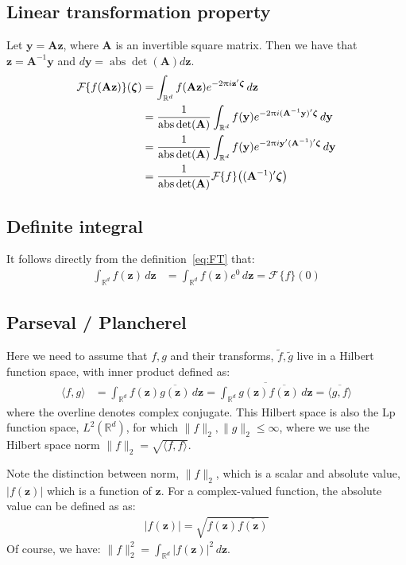 \documentclass[a4paper,oneside,12pt,english]{report}
\def\zvec{\mathbf{z}}
\DeclareMathOperator{\abs}{abs}
\def\R{\mathbb{R}}
\def\yvec{\mathbf{y}}
\def\Fset{\mathcal{F}}
\newcommand\FT[2][]{\Fset_{#1}\{#2\}}
\def\conj#1{\overline{#1}}
\begin{document}
\subsection{Linear transformation property}
\def\Amat{\mathbf{A}}
Let $\yvec = \Amat\zvec$, where $\Amat$ is an invertible square matrix. Then we have that $\zvec = \Amat^{-1}\yvec$ and $d\yvec = \abs{\det(\Amat)}d\zvec$. 
\begin{align}
\label{eq:ftscaling}
\begin{split}
\FT{f(\Amat\zvec)}(\zetavec) &= \int_{\R^d} f(\Amat\zvec)e^{-2\uppi i\zvec'\zetavec}\,d\zvec\\
&= \frac1{\abs{\det(\Amat)}}\int_{\R^d} f(\yvec)e^{-2\uppi i(\Amat^{-1}\yvec)'\zetavec}\,d\yvec\\
&= \frac1{\abs{\det(\Amat)}}\int_{\R^d} f(\yvec)e^{-2\uppi i\yvec'(\Amat^{-1})'\zetavec}\,d\yvec\\
&= \frac1{\abs{\det(\Amat)}}\FT{f}\bigl((\Amat^{-1})'\zetavec\bigr)
\end{split}
\end{align}

 
\subsection{Definite integral}
It follows directly from the definition~\eqref{eq:FT} that:
\begin{align}
\label{eq:di}
\int_{\R^d} f(\zvec)\,d\zvec &= \int_{\R^d} f(\zvec)e^0\,d\zvec = \FT{f}(0)
\end{align}



\subsection{Parseval / Plancherel}
\def\dotp#1#2{\langle#1,#2\rangle}
\def\norm#1{\lVert#1\rVert_2}
\def\abs#1{\lvert#1\rvert}
Here we need to assume that $f,g$ and their transforms, $\tilde f,\tilde g$ live in a Hilbert function space, with inner product defined as:
\begin{align}
\dotp{f}{g} &= \int_{\R^d} f(\zvec)\conj{g(\zvec)} \,d\zvec
= \conj{\int_{\R^d} g(\zvec)\conj{f(\zvec)} \,d\zvec} = \conj{\dotp{g}{f}}
\end{align}
where the overline denotes complex conjugate. This Hilbert space is also the Lp function space, $L^2(\R^d)$, for which $\norm{f},\norm{g}\le\infty$, where we use the Hilbert space norm $\norm{f}=\sqrt{\dotp{f}{f}}$.

Note the distinction between norm, $\norm{f}$, which is a scalar and absolute value, $\abs{f(\zvec)}$ which is a function of $\zvec$. For a complex-valued function, the absolute value can be defined as as:
\begin{align}
\abs{f(\zvec)}=\sqrt{f(\zvec)\conj{f(\zvec)}}
\end{align}
Of course, we have: $\norm{f}^2=\int_{\R^d}\abs{f(\zvec)}^2\,d\zvec$.\\
\end{document}
